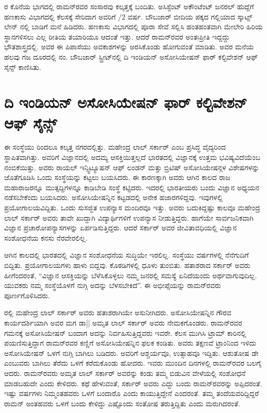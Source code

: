 ರ ಕೊನೆಯ ಭಾಗದಲ್ಲಿ ರಾಮನ್‍ರವರ ಸಂಸಾರವು ಕಲ್ಕತ್ತಕ್ಕೆ ಬಂದಿತು. ಅಸಿಸ್ಟೆಂಟ್ ಅಕೌಂಟೆಂಟ್ ಜನರಲ್ ಹುದ್ದೆಗೆ ಹಣಕಾಸು ವಿಭಾಗದಲ್ಲಿ ಕೆಲಸಕ್ಕೆ ಸೇರಿದಾಗ ಅವರಿಗೆ /2 ವರ್ಷ. ಬೌಬಜಾರ್ ಬೀದಿಯ ಪಕ್ಕದ ಗಲ್ಲಿಯಾದ ಸ್ಕಾಟ್ಸ್ ‍ಲೇನ್ ನಲ್ಲಿ ಬಾಡಿಗೆ ಮನೆ ಹಿಡಿದರು. ಹಣಕಾಸು ವಿಭಾಗದಲ್ಲಿ ಪೂರಾ ಸೇವೆ ಸಲ್ಲಿಸಿ ಹಂತಹಂತವಾಗಿ ಮೇಲೇರಿ ಹಿರಿಯ ಸ್ಥಾನಗಳಿಸಲು ಎಲ್ಲ ರೀತಿಯ ತಯಾರಿಯೂ ಆದಂತೆ ಇತ್ತು. ಆದರೆ ರಾಮನ್‍ರವರ ಅಂತಃಪ್ರೀತಿ ಇದ್ದದ್ದು ಭೌತಶಾಸ್ತ್ರದಲ್ಲಿ. ಅವರ ಈ ಪಿಪಾಸೆಯು ಅವಕಾಶಗಳನ್ನು ಅರಸಿಕೊಂಡು ಹೋಗುವಂತೆ ಮಾಡಿತು. ಅವರ ಮನೆಯ ಹಲವು ಗಜ ದೂರದಲ್ಲಿ ನಂ. ಬೌಬಜಾರ್ ಸ್ಟ್ರೀಟ್‍ನಲ್ಲಿ ದಿ ಇಂಡಿಯನ್ ಅಸೋಸಿಯೇಷನ್ ಫಾರ್ ಕಲ್ಟಿವೇಶನ್ ಆಫ್ ಸೈನ್ಸ್ ಕಾಣಿಸಿತು.


\section{ದಿ ಇಂಡಿಯನ್ ಅಸೋಸಿಯೇಷನ್ ಫಾರ್ ಕಲ್ಟಿವೇಶನ್ ಆಫ್ ಸೈನ್ಸ್}

ಈ ಸಂಸ್ಥೆಯು  ರಿಂದಲೂ ಕಲ್ಕತ್ತ ನಗರದಲ್ಲಿತ್ತು. ಮಹೇಂದ್ರ ಲಾಲ್ ಸರ್ಕಾರ್ ಎಂಬ ಪ್ರಸಿದ್ಧ ವೈದ್ಯರಿಂದ ಸ್ಥಾಪಿತವಾಗಿತ್ತು. ಅವರಿಗೆ ವಿಜ್ಞಾನದಲ್ಲಿ ಅದಮ್ಯ ಆಸಕ್ತಿಯಿತ್ತಲ್ಲದೆ ಭಾರತದಲ್ಲಿ ವಿಜ್ಞಾನಕ್ಕೆ ಉತ್ತಮ ಭವಿಷ್ಯವಿದೆಯೆಂಬ ನಂಬಿಕೆಯಿತ್ತು. ಅವರು ರಾಯಲ್ ಇನ್ಸ್ಟಿಟ್ಯೂಷನ್ ಆಫ್ ಲಂಡನ್ ಮತ್ತು ಬ್ರಿಟಿಷ್ ಅಸೋಸಿಯೇಷನ್ಗಳ ವಿಶೇಷಗಳನ್ನು ಜೊತೆಗೂಡಿಸಿ ಒಂದು ಸಂಸ್ಥೆಯನ್ನು ಕಟ್ಟಲು ಬಯಸಿದರು. ಈ ಕಾರಣಕ್ಕಾಗಿ ಅವರು ಆಗಿನ ಕಾಲದ ರಾಜ ಮಹಾರಾಜರನ್ನೂ ಮುತ್ಸದ್ದಿಗಳನ್ನೂ ಕಾಡಿಬೇಡಿ ಸಂಸ್ಥೆ ಕಟ್ಟಿದರು. ಇದರಲ್ಲಿ ಭಾರತೀಯರು ಬಂದು ವಿಜ್ಞಾನ ಅಧ್ಯಯನ ನಡೆಸಬೇಕೆಂದು ಬಯಸಿದರು. ಅಸೋಸಿಯೇಷನ್ನಿನ ಕಟ್ಟಡದಲ್ಲಿ ಅನೇಕ ಹಜಾರಗಳಿದ್ದವು. ಇವುಗಳಲ್ಲಿ ಪ್ರಯೋಗಾಲಯವಿದ್ದಿತು. ಒಂದು ಸುಸಜ್ಜಿತ ಉಪನ್ಯಾಸ ಮಂದಿರವೂ ಇತ್ತು. ಅವರು ಬದುಕಿದ್ದಷ್ಟು ಕಾಲವೂ ಮಹೇಂದ್ರ ಲಾಲ್ ಸರ್ಕಾರ್ ಅವರು ತಾವೇ ಖುದ್ದಾಗಿ ವಿದ್ಯಾರ್ಥಿಗಳಿಗೆ ಉಪನ್ಯಾಸ ನೀಡುತ್ತಿದ್ದರು. ಹಾಗೆಯೇ ಸಾರ್ವಜನಿಕವಾಗಿ ವಿಜ್ಞಾನ ಪ್ರಚಾರೋಪನ್ಯಾಸಗಳನ್ನು ಏರ್ಪಡಿಸುತ್ತಿದ್ದರು. ಆದರೆ ಸರ್ಕಾರ್ ಅವರ ಜೀವಿತಾವಧಿಯಲ್ಲಿ ವಿಜ್ಞಾನ ಸಂಶೋಧನೆಯ ಕನಸು ನೆರವೇರಲಿಲ್ಲ.

ಆಗಿನ ಕಾಲದಲ್ಲಿ ಭಾರತದಲ್ಲಿ ವಿಜ್ಞಾನ ಸಂಶೋಧನೆಯ ಸುದ್ಧಿಯೇ ಇರಲಿಲ್ಲ. ಸಂಸ್ಥೆಯು  ವರ್ಷಗಳಲ್ಲಿ ನೆನೆಗುದಿಗೆ ಬಿದ್ದಿತು. ಪ್ರಯೋಗಾಲಯಗಳು ಹಾಳು ಬಿದ್ದವು. ಕೊಠಡಿಗಳಲ್ಲಿ ಧೂಳು ತುಂಬಿತು. ಹತಾಶರಾದ ಸರ್ಕಾರ್ ಅವರು ಹೀಗೆಂದರಂತೆ, “ವಿಜ್ಞಾನ ಆಸಕ್ತಿಯನ್ನು ಬೆಳೆಸಿಕೊಳ್ಳಲು ನಮ್ಮ ಜನರಲ್ಲಿ ಸಮಸ್ಯೆ ಏನಿದೆಯಂದು ಅರ್ಥವಾಗುವುದಿಲ್ಲ. ಯುವಕರು ನಮ್ಮ ಸಂಸ್ಥೆಯೊಳಗೆ ನುಗ್ಗಿ ಅದನ್ನು ಬೆಳಸಬೇಕಿದೆ”. ಈ ಅಭೀಪ್ಸೆಯನ್ನು ರಾಮನ್‍ರವರು ಪೂರ್ಣಗೊಳಿಸಿದರು.

ರಲ್ಲಿ ಮಹೇಂದ್ರ ಲಾಲ್ ಸರ್ಕಾರ್ ಅವರು ಹತಾಶರಾಗಿಯೇ ಅಸುನೀಗಿದರು. ಅಸೋಸಿಯೇಷನ್ನಿನ ಗೌರವ ಕಾರ್ಯದರ್ಶಿಯಾಗಿ ಅವರ ಮಗ ಡಾ|| ಅಮೃತ ಲಾಲ್ ಸರ್ಕಾರ್ ಅವರು ನೇಮಕಗೊಂಡರು. ರಾಮನ್‍ರವರ ಗಮನಕ್ಕೆ ಅಸೋಸಿಯೇಷನ್ ಬಂದಾಗ ಅದನ್ನು ನಿರ್ವಹಿಸುತ್ತಿದ್ದವರು ಇವರೇ. ಕೆಲಸ ಮುಗಿಸಿ ಟ್ರಾಮ್ ಕಾರಿನಲ್ಲಿ ಪಯಣಿಸುತ್ತಿದ್ದಾಗ ರಾಮನ್‍ರವರ ಕಣ್ಣಿಗೆ ಅಸೋಸಿಯೇಷನ್ನಿನ ಫಲಕ ಕಂಡಿತು. ಅವರು ತಕ್ಷಣವೆ ಟ್ರಾಂನಿಂದ ಇಳಿದು ಅಸೋಸಿಯೇಷನ್ ಒಳಗೆ ನುಗ್ಗಿ ಬಾಗಿಲು ಬಡಿದರು. ಅವರಿಗೆ ಆಶ್ಚರ್ಯವೂ, ಉತ್ಸಾಹವೂ ಇದ್ದಿತು. ಆಶುತೋಷ ಡೇ ಎಂಬುವರು ಬಾಗಿಲು ತೆರೆದು ಒಳಗೆ ಕರೆದುಕೊಂಡು ಹೋದರು. ಇವರು ಮುಂದಿನ ದಿನಗಳಲ್ಲಿ ರಾಮನ್‍ರವರ ಬಲಗೈ ಆದರು. ರಾಮನ್‍ರವರು ಅಮೃತ ಲಾಲ್ ಸರ್ಕಾರ್ ಅವರನ್ನು ಕಂಡು ತಮ್ಮ ಬಿಡುವಿನ ವೇಳೆಯಲ್ಲಿ ಸಂಶೋಧನೆ ಮಾಡಬಹುದೇ ಎಂದು ಕೇಳಿದರು. ಕಥೆ ಹೇಳುವಂತೆ, ಸರ್ಕಾರ್ ಅವರು ಎದ್ದು ಬಂದು ರಾಮನ್‍ರವರನ್ನು ಅಪ್ಪಿದರಂತೆ. ಇಷ್ಟು ವರ್ಷಗಳು ನಿಮ್ಮಂತಹವರು ಒಳಗೆ ಬಂದಾರೊ ಎಂದು ಕಾಯುತ್ತಿದ್ದೇನೆ ಎಂದರಂತೆ. ತಮ್ಮ ತಂದೆಯವರಿದ್ದಿದ್ದರೆ ರಾಮನ್ ಅಂತಹವರು ಒಳಗೆ ಬಂದು ಕೇಳಿದ್ದು ಎಷ್ಟೊಂದು ಸಂತೋಷ ತರುತ್ತಿದ್ದಿತು ಎಂದು ಮರುಗಿದರಂತೆ.

